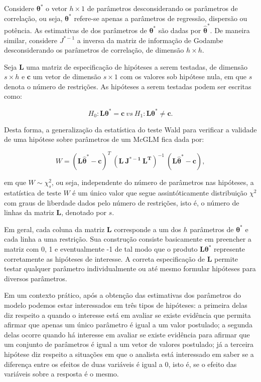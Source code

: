 Considere $\boldsymbol{\theta^{*}}$ o vetor $h \times 1$ de parâmetros desconsiderando os parâmetros de correlação, ou seja, $\boldsymbol{\theta^{*}}$ refere-se apenas a parâmetros de regressão, dispersão ou potência. As estimativas de dos parâmetros de $\boldsymbol{\theta^{*}}$ são dadas por $\boldsymbol{\hat\theta^{*}}$. De maneira similar, considere $J^{\boldsymbol{*}-1}$ a inversa da matriz de informação de Godambe desconsiderando os parâmetros de correlação, de dimensão $h \times h$.

Seja $\boldsymbol{L}$ uma matriz de especificação de hipóteses a serem testadas, de dimensão $s \times h$ e $\boldsymbol{c}$ um vetor de dimensão $s \times 1$ com os valores sob hipótese nula, em que $s$ denota o número de restrições. As hipóteses a serem testadas podem ser escritas como:

\begin{equation}
\label{eq:hipoteses_wald}
H_0: \boldsymbol{L}\boldsymbol{\theta^{*}} = \boldsymbol{c} \ vs \ H_1: \boldsymbol{L}\boldsymbol{\theta^{*}} \neq \boldsymbol{c}. 
\end{equation}

\noindent Desta forma, a generalização da estatística do teste Wald para verificar a validade de uma hipótese sobre parâmetros de um McGLM fica dada por:

$$
W = (\boldsymbol{L\hat\theta^{*}} - \boldsymbol{c})^T \ (\boldsymbol{L \ J^{\boldsymbol{*}-1} \ L^T})^{-1} \ (\boldsymbol{L\hat\theta^{*}} - \boldsymbol{c}),
$$

\noindent em que $W \sim \chi^2_s$, ou seja, independente do número de parâmetros nas hipóteses, a estatística de teste $W$ é um único valor que segue assintóticamente distribuição $\chi^2$ com graus de liberdade dados pelo número de restrições, isto é, o número de linhas da matriz $\boldsymbol{L}$, denotado por $s$.

Em geral, cada coluna da matriz $\boldsymbol{L}$ corresponde a um dos $h$ parâmetros de $\boldsymbol{\theta^{*}}$ e cada linha a uma restrição. Sua construção consiste basicamente em preencher a matriz com 0, 1 e eventualmente -1 de tal modo que o produto $\boldsymbol{L}\boldsymbol{\theta^{*}}$ represente corretamente as hipóteses de interesse. A correta especificação de $\boldsymbol{L}$ permite testar qualquer parâmetro individualmente ou até mesmo formular hipóteses para diversos parâmetros.

Em um contexto prático, após a obtenção das estimativas dos parâmetros do modelo podemos estar interessados em três tipos de hipóteses: a primeira delas diz respeito a quando o interesse está em avaliar se existe evidência que permita afirmar que apenas um único parâmetro é igual a um valor postulado; a segunda delas ocorre quando há interesse em avaliar se existe evidência para afirmar que um conjunto de parâmetros é igual a um vetor de valores postulado; já a terceira hipótese diz respeito a situações em que o analista está interessado em saber se a diferença entre os efeitos de duas variáveis é igual a 0, isto é, se o efeito das variáveis sobre a resposta é o mesmo.


